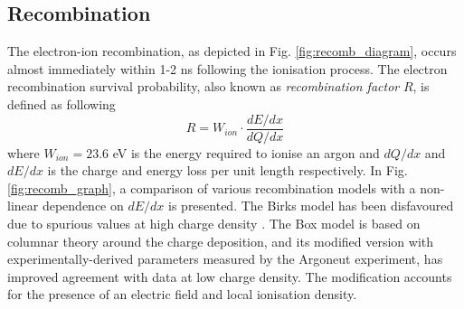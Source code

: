 \subsection{Recombination}
\label{sec:recomb}

The electron-ion recombination, as depicted in Fig. \ref{fig:recomb_diagram}, occurs almost immediately within 1-2 ns following the ionisation process.
The electron recombination survival probability, also known as \textit{recombination factor} $R$, is defined as following 
\begin{equation}
	R=W_{ion} \cdot \frac{dE/dx}{dQ/dx}
\end{equation}
where $W_{ion} = 23.6$ eV is the energy required to ionise an argon \cite{ion_e} and $dQ/dx$ and $dE/dx$ is the charge and energy loss per unit length respectively. 
In Fig. \ref{fig:recomb_graph}, a comparison of various recombination models with a non-linear dependence on $dE/dx$ is presented.
The Birks model has been disfavoured due to spurious values at high charge density \cite{argoneut_recomb}.
The Box model is based on columnar theory around the charge deposition, and its modified version with experimentally-derived parameters measured by the Argoneut experiment, has improved agreement with data at low charge density.
The modification accounts for the presence of an electric field and local ionisation density.
